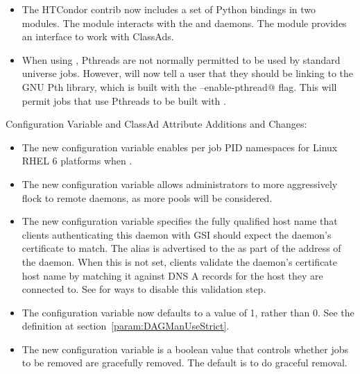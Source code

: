 \begin{itemize}
\item The HTCondor contrib now includes a set of Python bindings in
two modules.
The  module interacts with the  and 
 daemons. 
The  module provides an interface to work with ClassAds.

\item When using , 
Pthreads are not normally permitted to be used by standard universe jobs.
However,  will now tell a user that they
should be linking to the GNU Pth library,
which is  built with the \verb@--enable-pthread@ flag.
This will permit jobs that use Pthreads to be built with .


\end{itemize}

\noindent Configuration Variable and ClassAd Attribute Additions and Changes:

\begin{itemize}

\item The new configuration variable 
enables per job PID namespaces for Linux RHEL 6 platforms when .

\item The new configuration variable  allows
administrators to more aggressively flock to remote  daemons,
as more pools will be considered.

\item The new configuration variable  specifies the
  fully qualified host name that clients authenticating this daemon with 
  GSI should
  expect the daemon's certificate to match.  The alias is advertised
  to the  as part of the address of the daemon.
  When this is not set, clients validate the daemon's certificate
  host name by matching it against DNS A records for the host they
  are connected to.  See  for ways
  to disable this validation step.

\item The configuration variable  now
defaults to a value of 1, rather than 0.
See the definition at section~\ref{param:DAGManUseStrict}.

\item The new configuration variable 
is a boolean value that controls whether jobs to be removed are 
gracefully removed.
The default is to do graceful removal.
\end{itemize}

